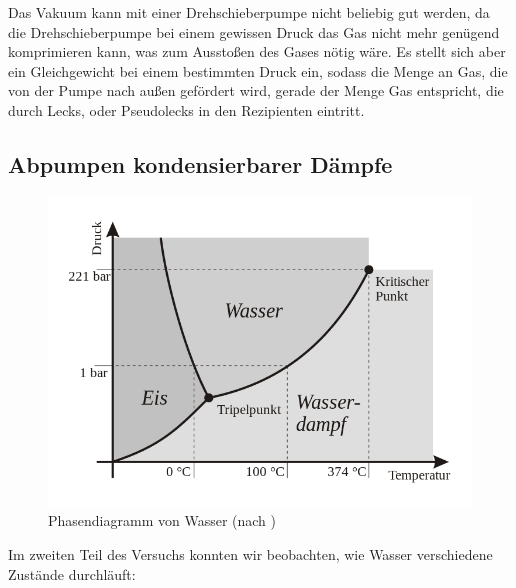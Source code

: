 \documentclass[12pt, a4paper]{scrartcl}
\begin{document}
		Das Vakuum kann mit einer Drehschieberpumpe nicht beliebig gut werden, da die Drehschieberpumpe bei einem gewissen Druck das Gas nicht mehr genügend komprimieren kann, was zum Ausstoßen des Gases nötig wäre.
		Es stellt sich aber ein Gleichgewicht bei einem bestimmten Druck ein, sodass die Menge an Gas, die von der Pumpe nach außen gefördert wird, gerade der Menge Gas entspricht, die durch Lecks, oder Pseudolecks in den Rezipienten eintritt.
		
		
	\subsection{Abpumpen kondensierbarer Dämpfe}
		
		\begin{figure}[H]
			\centering
			\includegraphics[width=.5\paperwidth]{phasen-wasser}
			\caption{Phasendiagramm von Wasser (nach \cite{wikibooks})}
		\end{figure}
    
        Im zweiten Teil des Versuchs konnten wir beobachten, wie Wasser verschiedene Zustände durchläuft:
        
\end{document}
